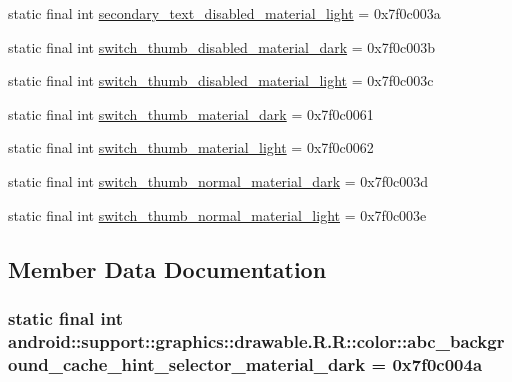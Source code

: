 \begin{CompactItemize}
\item 
static final int \hyperlink{classandroid_1_1support_1_1graphics_1_1drawable_1_1_r_1_1color_49e0cda5b19897be2bf7f6fa8c0657bc}{secondary\_\-text\_\-disabled\_\-material\_\-light} = 0x7f0c003a
\item 
static final int \hyperlink{classandroid_1_1support_1_1graphics_1_1drawable_1_1_r_1_1color_4d6521f53076d4e751da006e5547a7af}{switch\_\-thumb\_\-disabled\_\-material\_\-dark} = 0x7f0c003b
\item 
static final int \hyperlink{classandroid_1_1support_1_1graphics_1_1drawable_1_1_r_1_1color_bffc2fb1a6d54eb32b296860a4b7481d}{switch\_\-thumb\_\-disabled\_\-material\_\-light} = 0x7f0c003c
\item 
static final int \hyperlink{classandroid_1_1support_1_1graphics_1_1drawable_1_1_r_1_1color_eb5a09865a9a66c6856467e10ffdaf2f}{switch\_\-thumb\_\-material\_\-dark} = 0x7f0c0061
\item 
static final int \hyperlink{classandroid_1_1support_1_1graphics_1_1drawable_1_1_r_1_1color_1dfbbd6254c6f213e3419df063eb5c34}{switch\_\-thumb\_\-material\_\-light} = 0x7f0c0062
\item 
static final int \hyperlink{classandroid_1_1support_1_1graphics_1_1drawable_1_1_r_1_1color_2cc143cb052421114a3d1e892abf9597}{switch\_\-thumb\_\-normal\_\-material\_\-dark} = 0x7f0c003d
\item 
static final int \hyperlink{classandroid_1_1support_1_1graphics_1_1drawable_1_1_r_1_1color_2cb27b055b9fb042d962c72b17cddad7}{switch\_\-thumb\_\-normal\_\-material\_\-light} = 0x7f0c003e
\end{CompactItemize}


\subsection{Member Data Documentation}
\hypertarget{classandroid_1_1support_1_1graphics_1_1drawable_1_1_r_1_1color_9b39f10e222a3df0e2d97fd1c5138cf5}{
\subsubsection[{abc\_\-background\_\-cache\_\-hint\_\-selector\_\-material\_\-dark}]{\setlength{\rightskip}{0pt plus 5cm}static final int android::support::graphics::drawable.R.R::color::abc\_\-background\_\-cache\_\-hint\_\-selector\_\-material\_\-dark = 0x7f0c004a}}
\label{classandroid_1_1support_1_1graphics_1_1drawable_1_1_r_1_1color_9b39f10e222a3df0e2d97fd1c5138cf5}


